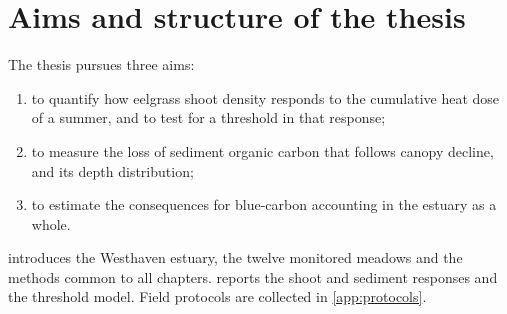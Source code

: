 \section{Aims and structure of the thesis}
\label{sec:aims}

The thesis pursues three aims:
\begin{enumerate}
  \item to quantify how eelgrass shoot density responds to the cumulative
        heat dose of a summer, and to test for a threshold in that
        response;
  \item to measure the loss of sediment organic carbon that follows
        canopy decline, and its depth distribution;
  \item to estimate the consequences for blue-carbon accounting in the
        estuary as a whole.
\end{enumerate}
 introduces the Westhaven estuary, the twelve
monitored meadows and the methods common to all chapters.
 reports the shoot and sediment responses and
the threshold model. Field protocols are collected in
\cref{app:protocols}.
